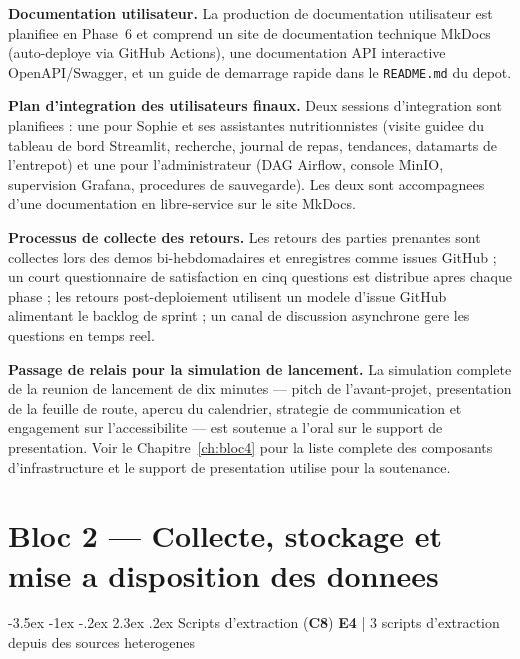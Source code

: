 \documentclass[a4paper,11pt,oneside,openany]{report}
\makeatletter
\renewcommand\section{\@startsection{section}{1}{\z@}%
  {-3.5ex \@plus -1ex \@minus -.2ex}%
  {2.3ex \@plus.2ex}%
  {\normalfont\Large\bfseries\color{ntgreen}}}
\newcommand{\competence}[1]{\textbf{\textcolor{ntgreen}{#1}}}
\newcommand{\evaluation}[1]{\textbf{\textcolor{ntblue}{#1}}}
\makeatother
\begin{document}
\textbf{Documentation utilisateur.} La production de documentation
utilisateur est planifiee en Phase~6 et comprend un site de
documentation technique MkDocs (auto-deploye via GitHub Actions),
une documentation API interactive OpenAPI/Swagger, et un guide de
demarrage rapide dans le \texttt{README.md} du depot.

\textbf{Plan d'integration des utilisateurs finaux.} Deux sessions
d'integration sont planifiees : une pour Sophie et ses assistantes
nutritionnistes (visite guidee du tableau de bord Streamlit,
recherche, journal de repas, tendances, datamarts de l'entrepot) et
une pour l'administrateur (DAG Airflow, console MinIO, supervision
Grafana, procedures de sauvegarde). Les deux sont accompagnees d'une
documentation en libre-service sur le site MkDocs.

\textbf{Processus de collecte des retours.} Les retours des parties
prenantes sont collectes lors des demos bi-hebdomadaires et
enregistres comme issues GitHub ; un court questionnaire de
satisfaction en cinq questions est distribue apres chaque phase ;
les retours post-deploiement utilisent un modele d'issue GitHub
alimentant le backlog de sprint ; un canal de discussion asynchrone
gere les questions en temps reel.

\textbf{Passage de relais pour la simulation de lancement.} La
simulation complete de la reunion de lancement de dix minutes ---
pitch de l'avant-projet, presentation de la feuille de route, apercu
du calendrier, strategie de communication et engagement sur
l'accessibilite --- est soutenue a l'oral sur le support de
presentation. Voir le Chapitre~\ref{ch:bloc4} pour la liste complete
des composants d'infrastructure et le support de presentation utilise
pour la soutenance.


\chapter{Bloc 2 --- Collecte, stockage et mise a disposition des donnees}
\label{ch:bloc2}

\section{Scripts d'extraction (\competence{C8})}
\label{sec:c8}
{\small\evaluation{E4} | 3 scripts d'extraction depuis des sources heterogenes}
\end{document}
